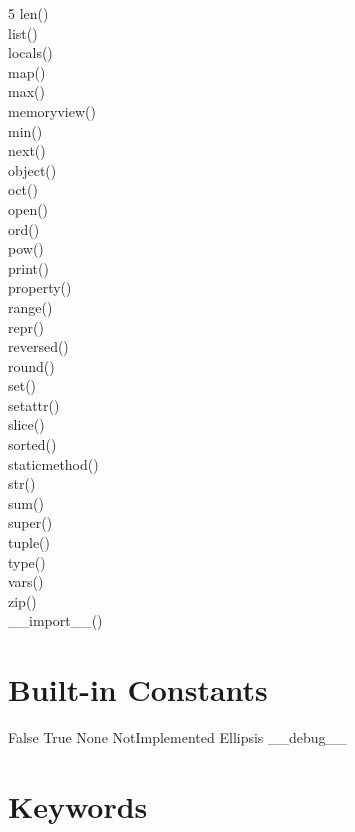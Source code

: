 \documentclass [8pt] {extarticle}
\begin{document}
\begin {multicols} {5}
        len() \\
        list() \\
        locals() \\
        map() \\
        max() \\
        memoryview() \\
        min() \\
        next() \\
        object() \\
        oct() \\
        open() \\
        ord() \\
        pow() \\
        print() \\
        property() \\
        range() \\
        repr() \\
        reversed() \\
        round() \\
        set() \\
        setattr() \\
        slice() \\
        sorted() \\
        staticmethod() \\
        str() \\
        sum() \\
        super() \\
        tuple() \\
        type() \\
        vars() \\
        zip() \\
        \_\_import\_\_() \\
    \end {multicols}

    \section {Built-in Constants}

    False \quad
    True \quad
    None \quad
    NotImplemented \quad
    Ellipsis \quad
    \_\_debug\_\_

    \section {Keywords}
\end{document}
